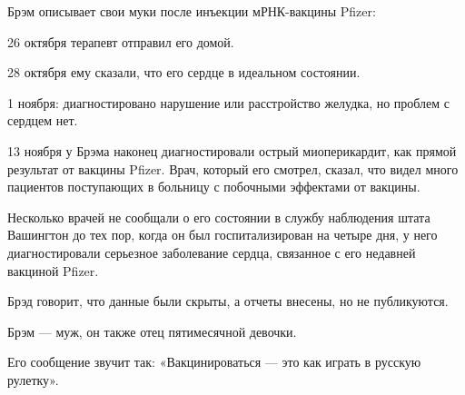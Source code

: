 Брэм описывает свои муки после инъекции мРНК-вакцины Pfizer:

26 октября терапевт отправил его домой.

28 октября ему сказали, что его сердце в идеальном состоянии.

1 ноября: диагностировано нарушение или расстройство желудка, но проблем с
сердцем нет.

13 ноября у Брэма наконец диагностировали острый миоперикардит, как прямой
результат от вакцины Pfizer. Врач, который его смотрел, сказал, что видел много
пациентов поступающих в больницу с побочными эффектами от вакцины.

Несколько врачей не сообщали о его состоянии в службу наблюдения штата Вашингтон
до тех пор, когда он был госпитализирован на четыре дня, у него диагностировали
серьезное заболевание сердца, связанное с его недавней вакциной Pfizer.

Брэд говорит, что данные были скрыты, а отчеты внесены, но не публикуются.

Брэм — муж, он также отец пятимесячной девочки.

Его сообщение звучит так: «Вакцинироваться — это как играть в русскую рулетку».
